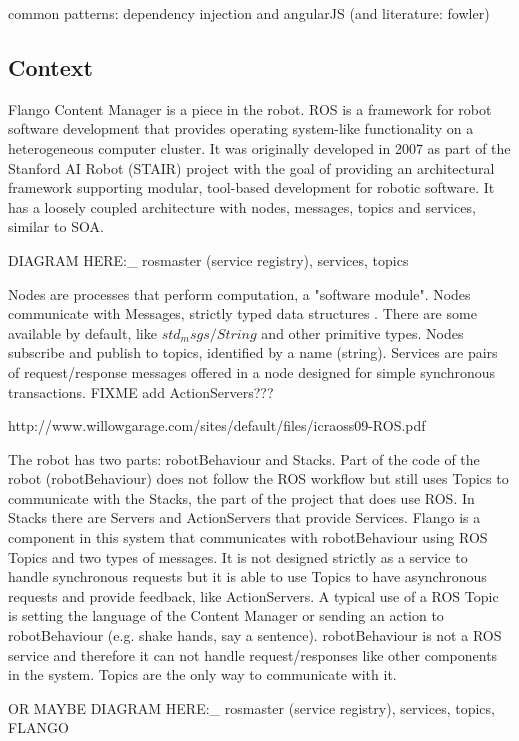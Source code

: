 common patterns:
dependency injection and angularJS (and literature: fowler)

\subsection{Context}
Flango Content Manager is a piece in the robot.
\ac{ROS} is a framework for robot software development that provides operating system-like functionality on a heterogeneous computer cluster. 
It was originally developed in 2007 as part of the Stanford AI Robot (STAIR) project with the goal of providing an architectural framework supporting modular, tool-based development for robotic software.
It has a loosely coupled architecture with nodes, messages, topics and services, similar to \ac{SOA}.

DIAGRAM HERE:_ rosmaster (service registry), services, topics

Nodes are processes that perform computation, a "software module". 
Nodes communicate with Messages, strictly typed data structures . There are some available by default, like $std_msgs/String$ and other primitive types.
Nodes subscribe and publish to topics, identified by a name (string).
Services are pairs of request/response messages offered in a node designed for simple synchronous transactions.
FIXME add ActionServers???


http://www.willowgarage.com/sites/default/files/icraoss09-ROS.pdf

The robot has two parts: robotBehaviour and Stacks.
Part of the code of the robot (robotBehaviour) does not follow the \ac{ROS} workflow but still uses Topics to communicate with the Stacks, the part of the project that does use \ac{ROS}.
In Stacks there are Servers and ActionServers that provide Services.
Flango is a component in this system that communicates with robotBehaviour using \ac{ROS} Topics and two types of messages.
It is not designed strictly as a service to handle synchronous requests but it is able to use Topics to have asynchronous requests and provide feedback, like ActionServers.
A typical use of a \ac{ROS} Topic is setting the language of the Content Manager or sending an action to robotBehaviour (e.g. shake hands, say a sentence).
robotBehaviour is not a \ac{ROS} service and therefore it can not handle request/responses like other components in the system.
Topics are the only way to communicate with it.

OR MAYBE DIAGRAM HERE:_ rosmaster (service registry), services, topics, FLANGO


